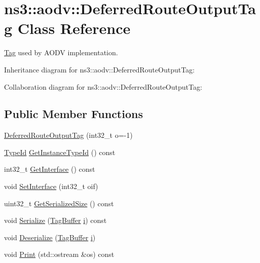 \hypertarget{classns3_1_1aodv_1_1DeferredRouteOutputTag}{}\section{ns3\+:\+:aodv\+:\+:Deferred\+Route\+Output\+Tag Class Reference}
\label{classns3_1_1aodv_1_1DeferredRouteOutputTag}


\hyperlink{classns3_1_1Tag}{Tag} used by A\+O\+DV implementation.  




Inheritance diagram for ns3\+:\+:aodv\+:\+:Deferred\+Route\+Output\+Tag\+:


Collaboration diagram for ns3\+:\+:aodv\+:\+:Deferred\+Route\+Output\+Tag\+:
\subsection*{Public Member Functions}
\begin{DoxyCompactItemize}
\item 
\hyperlink{classns3_1_1aodv_1_1DeferredRouteOutputTag_abe7f1553c9328fe1964e8a7189de2cc4}{Deferred\+Route\+Output\+Tag} (int32\+\_\+t o=-\/1)
\item 
\hyperlink{classns3_1_1TypeId}{Type\+Id} \hyperlink{classns3_1_1aodv_1_1DeferredRouteOutputTag_afb5a906dff1291f949fff06986185809}{Get\+Instance\+Type\+Id} () const 
\item 
int32\+\_\+t \hyperlink{classns3_1_1aodv_1_1DeferredRouteOutputTag_a0068243f879a24961378ee07005dc294}{Get\+Interface} () const 
\item 
void \hyperlink{classns3_1_1aodv_1_1DeferredRouteOutputTag_a9b2c74684677bc70ca399a68fd8297bb}{Set\+Interface} (int32\+\_\+t oif)
\item 
uint32\+\_\+t \hyperlink{classns3_1_1aodv_1_1DeferredRouteOutputTag_ac73ae91c5a3a51bada4df76aa50531c7}{Get\+Serialized\+Size} () const 
\item 
void \hyperlink{classns3_1_1aodv_1_1DeferredRouteOutputTag_a81f84d959aff98d327ab53cea1edc0d5}{Serialize} (\hyperlink{classns3_1_1TagBuffer}{Tag\+Buffer} \hyperlink{lte__uplink__power__control_8m_a6f6ccfcf58b31cb6412107d9d5281426}{i}) const 
\item 
void \hyperlink{classns3_1_1aodv_1_1DeferredRouteOutputTag_aa6d8461b075f582d5641e07ac078ea4b}{Deserialize} (\hyperlink{classns3_1_1TagBuffer}{Tag\+Buffer} \hyperlink{lte__uplink__power__control_8m_a6f6ccfcf58b31cb6412107d9d5281426}{i})
\item 
void \hyperlink{classns3_1_1aodv_1_1DeferredRouteOutputTag_add546b151f240529b1a8a7a7690d0867}{Print} (std\+::ostream \&os) const 
\end{DoxyCompactItemize}
